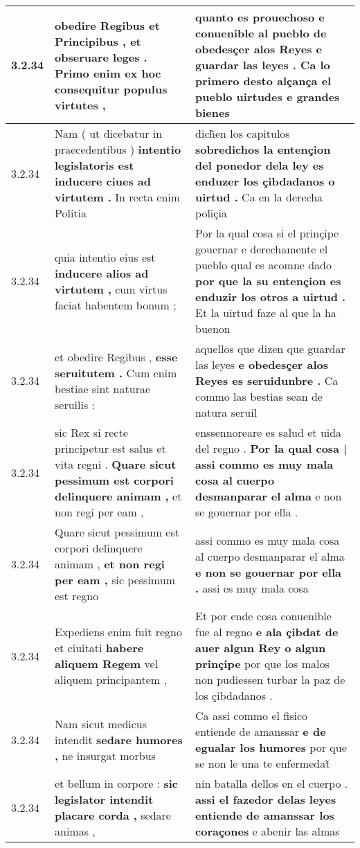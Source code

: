 \begin{tabular}{|p{1cm}|p{6.5cm}|p{6.5cm}|}
3.2.34 & obedire Regibus et Principibus , \textbf{ et obseruare leges . } Primo enim ex hoc consequitur populus virtutes , & quanto es prouechoso e conuenible al pueblo de obedesçer alos Reyes \textbf{ e guardar las leyes . } Ca lo primero desto alçança el pueblo uirtudes e grandes bienes \\\hline
3.2.34 & Nam ( ut dicebatur in praecedentibus ) \textbf{ intentio legislatoris est inducere ciues ad virtutem . } In recta enim Politia & dich̃en los capitulos \textbf{ sobredichos la entençion del ponedor dela ley es enduzer los çibdadanos o uirtud . } Ca en la derecha poliçia \\\hline
3.2.34 & quia intentio eius est \textbf{ inducere alios ad virtutem , } cum virtus faciat habentem bonum ; & Por la qual cosa si el prinçipe gouernar e derechamente el pueblo qual es acomne dado \textbf{ por que la su entençion es enduzir los otros a uirtud . } Et la uirtud faze al que la ha buenon \\\hline
3.2.34 & et obedire Regibus , \textbf{ esse seruitutem . } Cum enim bestiae sint naturae seruilis : & aquellos que dizen que guardar las leyes \textbf{ e obedesçer alos Reyes es seruidunbre . } Ca commo las bestias sean de natura seruil \\\hline
3.2.34 & sic Rex si recte principetur est salus et vita regni . \textbf{ Quare sicut pessimum est corpori delinquere animam , } et non regi per eam , & enssennoreare es salud et uida del regno . \textbf{ Por la qual cosa | assi commo es muy mala cosa al cuerpo desmanparar el alma } e non se gouernar por ella . \\\hline
3.2.34 & Quare sicut pessimum est corpori delinquere animam , \textbf{ et non regi per eam , } sic pessimum est regno & assi commo es muy mala cosa al cuerpo desmanparar el alma \textbf{ e non se gouernar por ella . } assi es muy mala cosa \\\hline
3.2.34 & Expediens enim fuit regno et ciuitati \textbf{ habere aliquem Regem } vel aliquem principantem , & Et por ende cosa conuenible fue al regno \textbf{ e ala çibdat de auer algun Rey o algun prinçipe } por que los malos non pudiessen turbar la paz de los çibdadanos . \\\hline
3.2.34 & Nam sicut medicus intendit \textbf{ sedare humores , } ne insurgat morbus & Ca assi commo el fisico entiende de amanssar \textbf{ e de egualar los humores } por que se non le una te enfermedat̃ \\\hline
3.2.34 & et bellum in corpore : \textbf{ sic legislator intendit placare corda , } sedare animas , & nin batalla dellos en el cuerpo . \textbf{ assi el fazedor delas leyes entiende de amanssar los coraçones } e abenir las almas \\\hline

\end{tabular}
